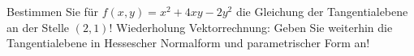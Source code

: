 \item Bestimmen Sie für $f(x,y) = x^2 + 4xy -2y^2$ die Gleichung der Tangentialebene an der Stelle $(2,1)$! Wiederholung Vektorrechnung: Geben Sie weiterhin die Tangentialebene in Hessescher Normalform und parametrischer Form an!
